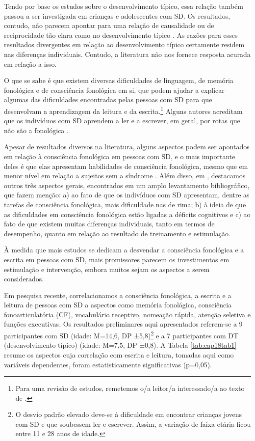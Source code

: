 \documentclass[output=paper,colorlinks,citecolor=brown,booklanguage=portuguese]{langscibook}
\begin{document}
Tendo por base os estudos sobre o desenvolvimento típico, essa relação também passou a ser investigada em crianças e adolescentes com SD. Os resultados, contudo, não parecem apontar para uma relação de causalidade ou de reciprocidade tão clara como no desenvolvimento típico \citep{Lorandi2019}. As razões para esses resultados divergentes em relação ao desenvolvimento típico certamente residem nas diferenças individuais. Contudo, a literatura não nos fornece resposta acurada em relação a isso.

O que se sabe é que existem diversas dificuldades de linguagem, de memória fonológica e de consciência fonológica em si, que podem ajudar a explicar algumas das dificuldades encontradas pelas pessoas com SD para que desenvolvam a aprendizagem da leitura e da escrita.\footnote{Para uma revisão de estudos, remetemos o/a leitor/a interessado/a ao texto de \citet{Lorandi2019}.} Alguns autores acreditam que os indivíduos com SD aprendem a ler e a escrever, em geral, por rotas que não são a fonológica \citep{Cossu1993, Hulme2012}.

Apesar de resultados diversos na literatura, alguns aspectos podem ser apontados em relação à consciência fonológica em pessoas com SD, e o mais importante deles é que elas apresentam habilidades de consciência fonológica, mesmo que em menor nível em relação a sujeitos sem a síndrome \citep{Lorandi2019}. Além disso, em \citet{Lorandi2019}, destacamos outros três aspectos gerais, encontrados em um amplo levantamento bibliográfico, que fazem menção: a) ao fato de que os indivíduos com SD apresentam, dentre as tarefas de consciência fonológica, mais dificuldade nas de rima; b) à ideia de que as dificuldades em consciência fonológica estão ligadas a déficits cognitivos e c) ao fato de que existem muitas diferenças individuais, tanto em termos de desempenho, quanto em relação ao resultado de treinamento e estimulação.

À medida que mais estudos se dedicam a desvendar a consciência fonológica e a escrita em pessoas com SD, mais promissores parecem os investimentos em estimulação e intervenção, embora muitos sejam os aspectos a serem considerados.

Em pesquisa recente, correlacionamos a consciência fonológica, a escrita e a leitura de pessoas com SD a aspectos como memória fonológica, consciência fonoarticulatória (CF), vocabulário receptivo, nomeação rápida, atenção seletiva e funções executivas. Os resultados preliminares aqui apresentados referem-se a 9 participantes com SD (idade: M=14,6, DP ±5,8)\footnote{O desvio padrão elevado deve-se à dificuldade em encontrar crianças jovens com SD e que soubessem ler e escrever. Assim, a variação de faixa etária ficou entre 11 e 28 anos de idade.} e a 7 participantes com DT (desenvolvimento típico) (idade: M=7,5, DP ±0,8). A Tabela \ref{tab:cap18tab1} resume os aspectos cuja correlação com escrita e leitura, tomadas aqui como variáveis dependentes, foram estatisticamente significativas (p=0,05).
\end{document}
